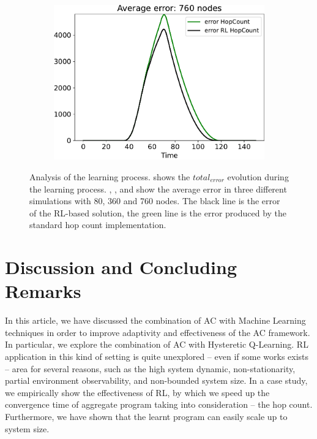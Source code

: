 \documentclass[conference]{IEEEtran}
\newcommand{\todos}[1]{\todo[inline, color=cyan]{\textbf{TODO}: #1}}
\begin{document}
\begin{figure}
\begin{subfigure}[b]{0.3\textwidth}
      \includegraphics[width=\textwidth]{img/760}
      \caption{}
      \label{fig:simulation-d}
  \end{subfigure}
  \caption{Analysis of the learning process.  shows the $total_{error}$ evolution during the learning process. , , and  show the average error in three different simulations with 80, 360 and 760 nodes. 
  The black line is the error of the RL-based solution, 
  the green line is the error produced by the standard hop count implementation.}
  \label{fig:simulation}
\end{figure}

\section{Discussion and Concluding Remarks}\label{conclusion}
In this article, we have discussed the combination of AC with Machine Learning techniques in order to improve adaptivity
 and effectiveness of the AC framework.
%
In particular, we explore the combination of AC with Hysteretic Q-Learning.
RL application in this kind of setting is quite unexplored -- even if some works exists~\cite{DBLP:conf/icml/YangLLZZW18} -- 
 area for several reasons, such as the high system dynamic, non-stationarity,  partial environment observability, and non-bounded system size.
In a case study, we empirically show the effectiveness of RL, by which we speed up the convergence time of
 aggregate program taking into consideration -- the hop count.
Furthermore, we have shown that the learnt program can easily scale up to system size.
\end{document}
